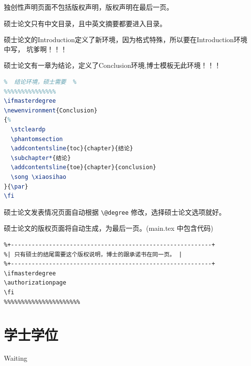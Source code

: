 独创性声明页面不包括版权声明，版权声明在最后一页。

硕士论文只有中文目录，且中英文摘要都要进入目录。

硕士论文的Introduction定义了新环境，因为格式特殊，所以要在Introduction环境中写，
坑爹啊！！！

硕士论文有一章为结论，定义了Conclusion环境,博士模板无此环境！！！
\begin{lstlisting}[language=TeX]
%%%%%%%%%%%%%%%
%  结论环境，硕士需要  %
%%%%%%%%%%%%%%%
\ifmasterdegree
\newenvironment{Conclusion}
{%
  \stcleardp
  \phantomsection
  \addcontentsline{toc}{chapter}{结论}
  \subchapter*{结论}
  \addcontentsline{toe}{chapter}{conclusion}
  \song \xiaosihao
}{\par}
\fi
\end{lstlisting}

硕士论文发表情况页面自动根据 \lstinline|\@degree| 修改，选择硕士论文选项就好。

硕士论文的版权页面将自动生成，为最后一页。(main.tex 中包含代码)
\begin{lstlisting}
%+----------------------------------------------------------+
%| 只有硕士的结尾需要这个版权说明，博士的跟承诺书在同一页。 |
%+----------------------------------------------------------+
\ifmasterdegree
\authorizationpage
\fi
%%%%%%%%%%%%%%%%%%%%%%
\end{lstlisting}


\section{学士学位}
Waiting
